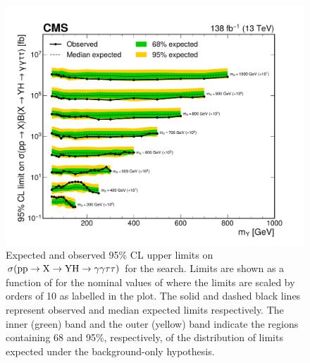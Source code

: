 \begin{figure}
    \centering
    \includegraphics[width=\textwidth]{Figures/Dihiggs/results/limits/limits_stack_mx_y_tautau_paper.pdf}
    \caption[\XYttHgg Upper Limits in as Function of \mY in Slices of \mX]{Expected and observed 95\% CL upper limits on $\sigma(\mathrm{p}\mathrm{p} \to \mathrm{X} \to \mathrm{Y}\mathrm{H} \to \gamma\gamma\tau\tau)$ for the \XYttHgg search. Limits are shown as a function of \mY for the nominal values of \mX where the limits are scaled by orders of 10 as labelled in the plot. The solid and dashed black lines represent observed and median expected limits respectively. The inner (green) band and the outer (yellow) band indicate the regions containing 68 and 95\%, respectively, of the distribution of limits expected under the background-only hypothesis.}\label{fig:limits_stack_mx_y_tautau}
\end{figure}
